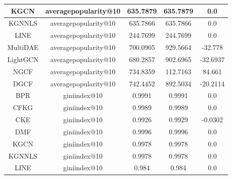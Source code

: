 \begin{table}[H]
{\begin{tabular}{|c|c|c|c|c|}
            KGCN             & averagepopularity@10 & 635.7879                       & 635.7879                       & 0.0                         \\ \hline
            KGNNLS           & averagepopularity@10 & 635.7866                       & 635.7866                       & 0.0                         \\ \hline
            LINE             & averagepopularity@10 & 244.7699                       & 244.7699                       & 0.0                         \\ \hline
            MultiDAE         & averagepopularity@10 & 700.0905                       & 929.5664                       & -32.778                     \\ \hline
            LightGCN         & averagepopularity@10 & 680.2857                       & 902.6965                       & -32.6937                    \\ \hline
            NGCF             & averagepopularity@10 & 734.8359                       & 112.7163                       & 84.661                      \\ \hline
            DGCF             & averagepopularity@10 & 742.4452                       & 892.5034                       & -20.2114                    \\ \hline
            BPR              & giniindex@10       & 0.9991                           & 0.9991                         & 0.0                         \\ \hline
            CFKG             & giniindex@10       & 0.9989                           & 0.9989                         & 0.0                         \\ \hline
            CKE              & giniindex@10       & 0.9926                           & 0.9929                         & -0.0302                    \\ \hline
            DMF              & giniindex@10       & 0.9996                           & 0.9996                         & 0.0                         \\ \hline
            KGCN             & giniindex@10       & 0.9978                           & 0.9978                         & 0.0                         \\ \hline
            KGNNLS           & giniindex@10       & 0.9978                           & 0.9978                         & 0.0                         \\ \hline
            LINE             & giniindex@10       & 0.984                            & 0.984                          & 0.0                         \\ \hline

\end{tabular}}
\end{table}
